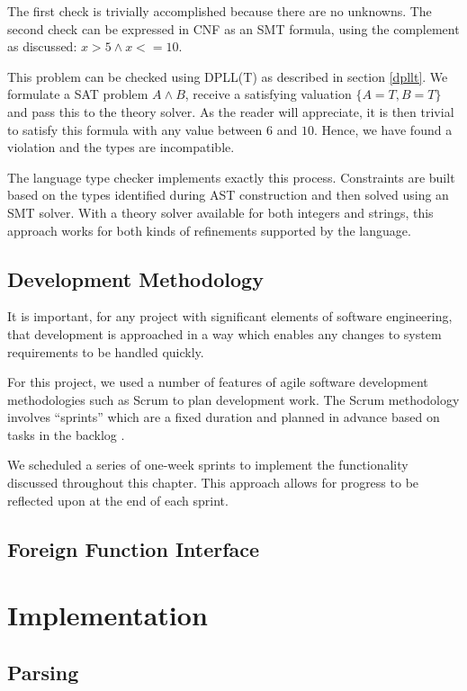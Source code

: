 \documentclass[a4paper,openany,12pt]{book}
\begin{document}
The first check is trivially accomplished because there are no unknowns.
The second check can be expressed in CNF as an SMT formula, using the complement as discussed: $x > 5 \land x <= 10$.

This problem can be checked using DPLL(T) as described in section \ref{dpllt}.
We formulate a SAT problem $A \land B$, receive a satisfying valuation $\{A=T, B=T\}$ and pass this to the theory
solver.
As the reader will appreciate, it is then trivial to satisfy this formula with any value between $6$ and $10$.
Hence, we have found a violation and the types are incompatible.

The language type checker implements exactly this process.
Constraints are built based on the types identified during AST construction and then solved using an SMT solver.
With a theory solver available for both integers and strings, this approach works for both kinds of refinements
supported by the language.

\section{Development Methodology}

It is important, for any project with significant elements of software engineering, that development is approached in a
way which enables any changes to system requirements to be handled quickly.

For this project, we used a number of features of agile software development methodologies such as Scrum to plan development work.
The Scrum methodology involves ``sprints'' which are a fixed duration and planned in advance based on tasks in the backlog \citep{sutherland2014scrum}.

We scheduled a series of one-week sprints to implement the functionality discussed throughout this chapter.
This approach allows for progress to be reflected upon at the end of each sprint.

\section{Foreign Function Interface}



\chapter{Implementation}

\section{Parsing}
\end{document}

